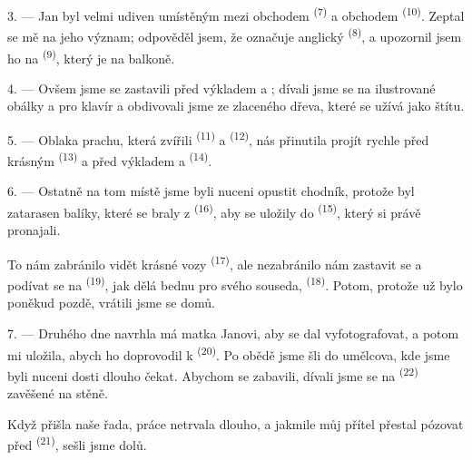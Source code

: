 3. --- Jan byl velmi udiven  umístěným mezi obchodem
 \textsuperscript{(7)} a obchodem 
\textsuperscript{(10)}. Zeptal se mě na jeho význam; odpověděl jsem, že označuje anglický
 \textsuperscript{(8)}, a upozornil jsem ho na
 \textsuperscript{(9)}, který je na balkoně.

\VUsaut{3.0mm}

4. --- Ovšem jsme se zastavili před výkladem 
  a ; dívali jsme se na ilustrované
obálky  a  pro klavír a obdivovali jsme
 ze zlaceného dřeva, které se užívá jako štítu.

5. --- Oblaka prachu, která zvířili  \textsuperscript{(11)} a
 \textsuperscript{(12)}, nás přinutila projít rychle před krásným
  \textsuperscript{(13)} a před
výkladem  a   \textsuperscript{(14)}.

6. --- Ostatně na tom místě jsme byli nuceni opustit chodník, protože byl zatarasen balíky,
které se braly z  \textsuperscript{(16)}, aby se uložily do
 \textsuperscript{(15)}, který si právě pronajali.

To nám zabránilo vidět krásné vozy  \textsuperscript{(17)}, ale nezabránilo
nám zastavit se a podívat se na  \textsuperscript{(19)}, jak dělá bednu pro
svého souseda,  \textsuperscript{(18)}. Potom, protože
už bylo poněkud pozdě, vrátili jsme se domů.

\VUsaut{3.0mm}

7. --- Druhého dne navrhla má matka Janovi, aby se dal vyfotografovat, a potom mi uložila,
abych ho doprovodil k  \textsuperscript{(20)}. Po obědě jsme šli do
 umělcova, kde jsme byli nuceni dosti dlouho čekat. Abychom se zabavili,
dívali jsme se na  \textsuperscript{(22)} zavěšené na stěně.

Když přišla naše řada, práce netrvala dlouho, a jakmile můj přítel přestal pózovat před
 \textsuperscript{(21)}, sešli jsme dolů.

